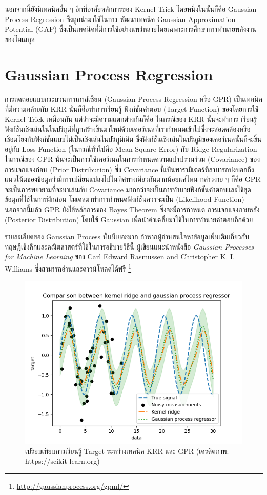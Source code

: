 นอกจากนี้ยังมีเทคนิคอื่น ๆ อีกที่อาศัยหลักการของ Kernel Trick โดยหนึ่งในนั้นก็คือ Gaussian Process Regression ซึ่งถูกนำมาใช้ในการ%
พัฒนาเทคนิค Gaussian Approximation Potential (GAP) ซึ่งเป็นเทคนิคที่มีการใช้อย่างแพร่หลายโดยเฉพาะการศึกษาการทำนายพลังงาน%
ของโมเลกุล

\section{Gaussian Process Regression}
\label{sec:kernel_gpr}

การถดถอยแบบกระบวนการเกาส์เซียน (Gaussian Process Regression หรือ GPR)  เป็นเทคนิคที่มีความคล้ายกับ KRR นั่นก็คือทำการเรียนรู้
ฟังก์ชันคำตอบ (Target Function) ของโดยการใช้ Kernel Trick เหมือนกัน แต่ว่าจะมีความแตกต่างกันก็คือ ในกรณีของ KRR นั้นจะทำการ%
เรียนรู้ฟังก์ชันเชิงเส้นในในปริภูมิที่ถูกสร้างขึ้นมาใหม่ด้วยเคอร์เนลที่เรากำหนดเข้าไปซึ่งจะสอดคล้องหรือเชื่อมโยงกับฟังก์ชันแบบไม่เป็นเชิงเส้นในปริภูมิเดิม 
ซึ่งฟังก์ชันเชิงเส้นในปริภูมิของเคอร์เนลนั้นก็จะขึ้นอยู่กับ Loss Function (ในกรณีทั่วไปคือ Mean Square Error) กับ Ridge Regularization 
ในกรณีของ GPR นั้นจะเป็นการใช้เคอร์เนลในการกำหนดความแปรปรวนร่วม (Covariance) ของการแจกแจงก่อน (Prior Distribution) 
ซึ่ง Covariance นี้เป็นพารามิเตอร์ที่สามารถบ่งบอกถึงแนวโน้มของข้อมูลว่ามีการเปลี่ยนแปลงไปในทิศทางเดียวกันมากน้อยแค่ไหน 
กล่าวง่าย ๆ ก็คือ GPR จะเป็นการพยายามที่จะมาเล่นกับ Covariance มากกว่าจะเป็นการทำนายฟังก์ชันคำตอบและใช้ชุดข้อมูลที่ใช้ในการฝึกสอน%
โมเดลมาทำการกำหนดฟังก์ชันควรจะเป็น (Likelihood Function) นอกจากนี้แล้ว GPR ยังใช้หลักการของ Bayes Theorem ซึ่งจะมีการกำหนด%
การแจกแจงภายหลัง (Posterior Distribution) โดยใช้ Gaussian เพื่อนำค่าเฉลี่ยมาใช้ในการทำนายคำตอบอีกด้วย

รายละเอียดของ Gaussian Process นั้นมีเยอะมาก ถ้าหากผู้อ่านสนใจหาข้อมูลเพิ่มเติมเกี่ยวกับทฤษฎีเชิงลึกและคณิตศาสตร์ที่ใช้ในการอธิบายวิธีนี้
ผู้เขียนแนะนำหนังสือ \textit{Gaussian Processes for Machine Learning} ของ Carl Edward Rasmussen and 
Christopher K. I. Williams ซึ่งสามารถอ่านและดาวน์โหลดได้ฟรี \footnote{\url{http://gaussianprocess.org/gpml/}}

\begin{figure}[H]
    \centering
    \includegraphics[width=0.8\linewidth]{fig/plot_gpr_kernel.png}
    \caption{เปรียบเทียบการเรียนรู้ Target ระหว่างเทคนิค KRR และ GPR (เครดิตภาพ: https://scikit-learn.org)}
    \label{fig:krr_gpr}
\end{figure}
